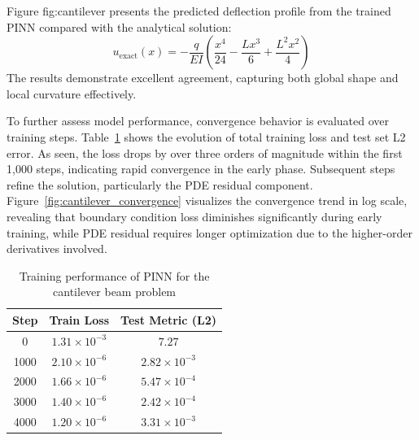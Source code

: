 \documentclass[12pt]{article}
\begin{document}
Figure {fig:cantilever} presents the predicted deflection profile from the trained PINN compared with the analytical solution:
\[
u_{\text{exact}}(x) = -\frac{q}{EI}\left(\frac{x^4}{24} - \frac{Lx^3}{6} + \frac{L^2x^2}{4}\right)
\]
The results demonstrate excellent agreement, capturing both global shape and local curvature effectively.

To further assess model performance, convergence behavior is evaluated over training steps. Table~\ref{tab:cantilever_convergence} shows the evolution of total training loss and test set L2 error. As seen, the loss drops by over three orders of magnitude within the first 1,000 steps, indicating rapid convergence in the early phase. Subsequent steps refine the solution, particularly the PDE residual component. Figure~\ref{fig:cantilever_convergence} visualizes the convergence trend in log scale, revealing that boundary condition loss diminishes significantly during early training, while PDE residual requires longer optimization due to the higher-order derivatives involved.

\begin{table}[htbp]
    \centering
    \begin{tabular}{c c c}
        \toprule
        \textbf{Step} & \textbf{Train Loss} & \textbf{Test Metric (L2)} \\
        \midrule
        0 & $1.31 \times 10^{-3}$ & $7.27$ \\
        1000 & $2.10 \times 10^{-6}$ & $2.82 \times 10^{-3}$ \\
        2000 & $1.66 \times 10^{-6}$ & $5.47 \times 10^{-4}$ \\
        3000 & $1.40 \times 10^{-6}$ & $2.42 \times 10^{-4}$ \\
        4000 & $1.20 \times 10^{-6}$ & $3.31 \times 10^{-3}$ \\
        \bottomrule
    \end{tabular}
    \caption{Training performance of PINN for the cantilever beam problem}
    \label{tab:cantilever_convergence}
\end{table}
\end{document}

